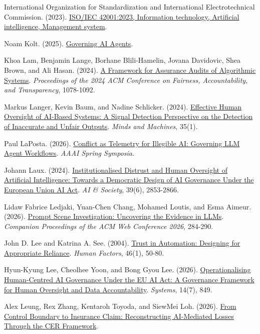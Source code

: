 \documentclass[11pt]{article}
\newenvironment{TAEReferences}{%
  \begin{list}{}{%
    \renewcommand{\makelabel}[1]{}%
    \setlength{\labelwidth}{0pt}%
    \setlength{\labelsep}{0pt}%
    \setlength{\leftmargin}{0.5in}%
    \setlength{\itemindent}{-0.5in}%
    \setlength{\itemsep}{0.45em}%
    \setlength{\parsep}{0pt}%
    \setlength{\topsep}{0.25em}%
  }%
}{\end{list}}
\begin{document}
\begin{TAEReferences}
\item International Organization for Standardization and International Electrotechnical Commission. (2023). \href{https://www.iso.org/standard/42001}{ISO/IEC 42001:2023, Information technology, Artificial intelligence, Management system}.
\item Noam Kolt. (2025). \href{https://arxiv.org/abs/2501.07913}{Governing AI Agents}.
\item Khoa Lam, Benjamin Lange, Borhane Blili-Hamelin, Jovana Davidovic, Shea Brown, and Ali Hasan. (2024). \href{https://doi.org/10.1145/3630106.3658957}{A Framework for Assurance Audits of Algorithmic Systems}. \emph{Proceedings of the 2024 ACM Conference on Fairness, Accountability, and Transparency}, 1078-1092.
\item Markus Langer, Kevin Baum, and Nadine Schlicker. (2024). \href{https://doi.org/10.1007/s11023-024-09701-0}{Effective Human Oversight of AI-Based Systems: A Signal Detection Perspective on the Detection of Inaccurate and Unfair Outputs}. \emph{Minds and Machines}, 35(1).
\item Paul LaPosta. (2026). \href{https://doi.org/10.1609/aaaiss.v8i1.42543}{Conflict as Telemetry for Illegible AI: Governing LLM Agent Workflows}. \emph{AAAI Spring Symposia}.
\item Johann Laux. (2024). \href{https://doi.org/10.1007/s00146-023-01777-z}{Institutionalised Distrust and Human Oversight of Artificial Intelligence: Towards a Democratic Design of AI Governance Under the European Union AI Act}. \emph{AI \& Society}, 39(6), 2853-2866.
\item Lidaw Fabrice Ledjaki, Yuan-Chen Chang, Mohamed Loutis, and Esma Aimeur. (2026). \href{https://doi.org/10.1145/3774905.3795469}{Prompt Scene Investigation: Uncovering the Evidence in LLMs}. \emph{Companion Proceedings of the ACM Web Conference 2026}, 284-290.
\item John D. Lee and Katrina A. See. (2004). \href{https://doi.org/10.1518/hfes.46.1.50_30392}{Trust in Automation: Designing for Appropriate Reliance}. \emph{Human Factors}, 46(1), 50-80.
\item Hyun-Kyung Lee, Cheolhee Yoon, and Bong Gyou Lee. (2026). \href{https://doi.org/10.3390/systems14070849}{Operationalising Human-Centred AI Governance Under the EU AI Act: A Governance Framework for Human Oversight and Data Accountability}. \emph{Systems}, 14(7), 849.
\item Alex Leung, Rex Zhang, Kentaroh Toyoda, and SiewMei Loh. (2026). \href{https://arxiv.org/abs/2606.03777}{From Control Boundary to Insurance Claim: Reconstructing AI-Mediated Losses Through the CER Framework}.

\end{TAEReferences}
\end{document}
